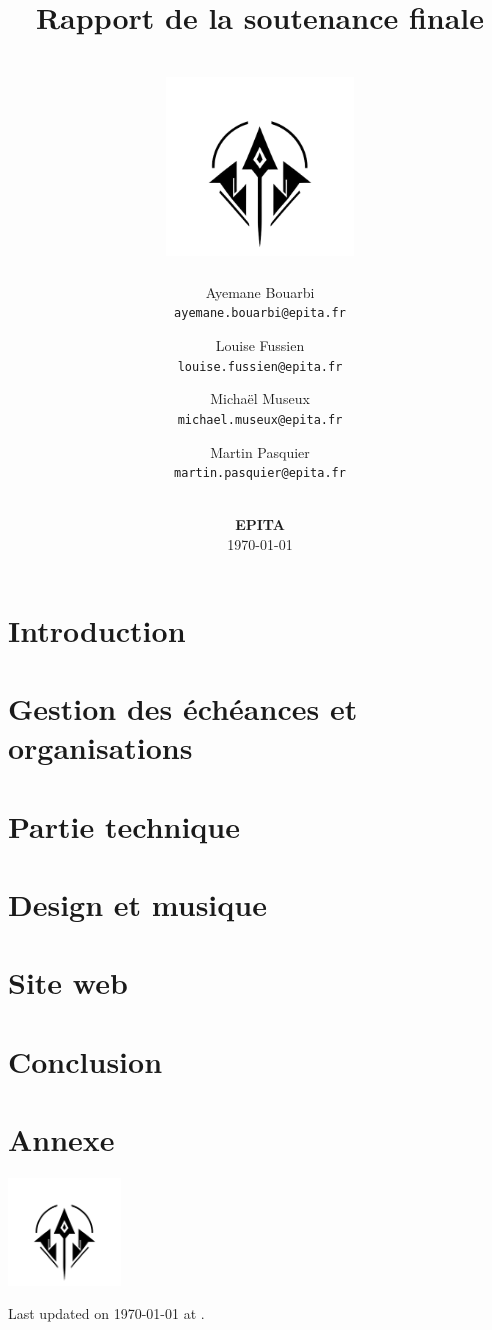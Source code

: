 \documentclass[12pt]{article}
\title{
    Rapport de la soutenance finale \\
    \textbf{\gameName} \\
    \vspace{0.5cm}
    \includegraphics[width=5cm]{assets/logo.png}
    \vspace{4.2cm}
}
\author{
    Ayemane Bouarbi \\
    \texttt{ayemane.bouarbi@epita.fr}
    \vspace{0.5cm}\and
    Louise Fussien \\
    \texttt{louise.fussien@epita.fr}
    \vspace{0.5cm}\and
    Michaël Museux \\
    \texttt{michael.museux@epita.fr}
    \vspace{0.5cm}\and
    Martin Pasquier \\
    \texttt{martin.pasquier@epita.fr}
}
\date{
    \vspace{1.5cm}
    \textbf{\companyName} \\
    \vspace{0.3cm}
    \textbf{EPITA} \\
    \vspace{1.5cm}
    \today
}
\begin{document}
\begin{titlepage}
    \maketitle
    \thispagestyle{empty} %
\end{titlepage}

\newpage
\thispagestyle{empty}
\mbox{}

\newpage
\tableofcontents


\newpage
\section{Introduction}


\newpage
\section{Gestion des échéances et organisations} %


\newpage
\section{Partie technique}


\newpage
\section{Design et musique}


\newpage
\section{Site web}



\newpage
\section{Conclusion}


\section{Annexe}




\centering
\vspace*{1.8cm}
\includegraphics[width=3cm]{assets/logo.png}

\vspace*{1cm}
Last updated on \today{} at \currenttime.
\end{document}
